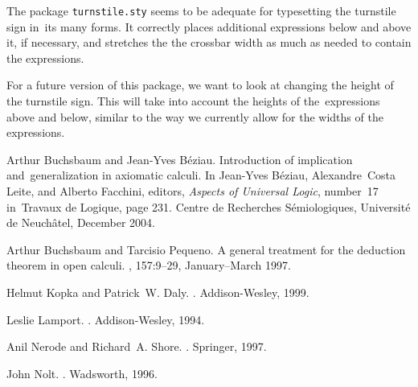 \documentclass{pracjourn}
\begin{document}
The package \texttt{turnstile.sty} seems to be adequate for typesetting the turnstile sign in~its many forms.  It correctly places additional expressions below and above it, if necessary, and stretches the the crossbar width as much as needed to contain the expressions.

For a future version of this package, we want to look at changing the height of the turnstile sign.  This will take into account the heights of the~expressions above and below, similar to the way we currently allow for the widths of the expressions.

\begin{thebibliography}{1}

Arthur Buchsbaum and Jean-Yves B{\'e}ziau.
\newblock Introduction of implication and~generalization in axiomatic calculi.
\newblock In Jean-Yves B{\'e}ziau, Alexandre~Costa Leite, and Alberto Facchini,
  editors, {\em Aspects of Universal Logic}, number~17 in~Travaux de Logique,
  page 231. Centre de Recherches S{\'e}miologiques, \mbox{Universit{\'e}} de
  Neuch{\^a}tel, December 2004.

Arthur Buchsbaum and Tarcisio Pequeno.
\newblock A general treatment for the deduction theorem in open calculi.
, 157:9--29, January--March 1997.

Helmut Kopka and Patrick~W. Daly.
.
\newblock Addison-Wesley, 1999.

Leslie Lamport.
.
\newblock Addison-Wesley, 1994.

Anil Nerode and Richard~A. Shore.
.
\newblock Springer, 1997.

John Nolt.
.
\newblock Wadsworth, 1996.

\end{thebibliography}
\end{document}
